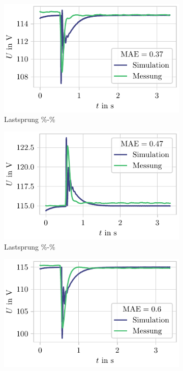 \begin{figure}
\centering
\begin{subfigure}{.49\textwidth}
	\centering
	\includegraphics[]{Bilder/ValMessung_0-50.pdf}
	\caption{Lastsprung \unit[0]{\%}-\unit[50]{\%}}
	\label{fig:ValMessung0-50}
\end{subfigure}
\begin{subfigure}{.49\textwidth}
	\centering
	\includegraphics[]{Bilder/ValMessung_50-0.pdf}
	\caption{Lastsprung \unit[50]{\%}-\unit[0]{\%}}
	\label{fig:ValMessung50-0}
\end{subfigure}
\begin{subfigure}{.49\textwidth}
	\centering
	\includegraphics[]{Bilder/ValMessung_0-100.pdf}

\end{subfigure}
\end{figure}
